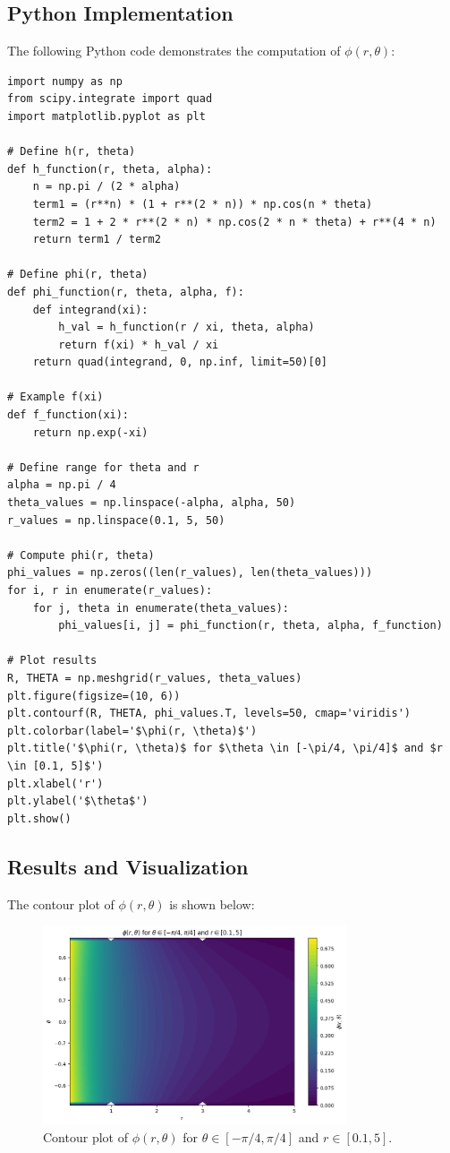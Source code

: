 \documentclass[a4paper, 12pt]{article}
\begin{document}
\subsection{Python Implementation}
The following Python code demonstrates the computation of $\phi(r, \theta)$:
\begin{lstlisting}[style=pythonstyle]
import numpy as np
from scipy.integrate import quad
import matplotlib.pyplot as plt

# Define h(r, theta)
def h_function(r, theta, alpha):
    n = np.pi / (2 * alpha)
    term1 = (r**n) * (1 + r**(2 * n)) * np.cos(n * theta)
    term2 = 1 + 2 * r**(2 * n) * np.cos(2 * n * theta) + r**(4 * n)
    return term1 / term2

# Define phi(r, theta)
def phi_function(r, theta, alpha, f):
    def integrand(xi):
        h_val = h_function(r / xi, theta, alpha)
        return f(xi) * h_val / xi
    return quad(integrand, 0, np.inf, limit=50)[0]

# Example f(xi)
def f_function(xi):
    return np.exp(-xi)

# Define range for theta and r
alpha = np.pi / 4
theta_values = np.linspace(-alpha, alpha, 50)
r_values = np.linspace(0.1, 5, 50)

# Compute phi(r, theta)
phi_values = np.zeros((len(r_values), len(theta_values)))
for i, r in enumerate(r_values):
    for j, theta in enumerate(theta_values):
        phi_values[i, j] = phi_function(r, theta, alpha, f_function)

# Plot results
R, THETA = np.meshgrid(r_values, theta_values)
plt.figure(figsize=(10, 6))
plt.contourf(R, THETA, phi_values.T, levels=50, cmap='viridis')
plt.colorbar(label='$\phi(r, \theta)$')
plt.title('$\phi(r, \theta)$ for $\theta \in [-\pi/4, \pi/4]$ and $r \in [0.1, 5]$')
plt.xlabel('r')
plt.ylabel('$\theta$')
plt.show()
\end{lstlisting}

\subsection{Results and Visualization}
The contour plot of $\phi(r, \theta)$ is shown below:

\begin{figure}[H]
    \centering
    \includegraphics[width=0.8\textwidth]{Phi.png}
    \caption{Contour plot of $\phi(r, \theta)$ for $\theta \in [-\pi/4, \pi/4]$ and $r \in [0.1, 5]$.}
    \label{fig:phi_contour}
\end{figure}
\end{document}
